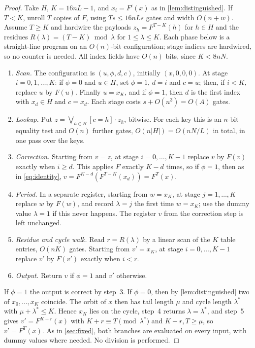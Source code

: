 \documentclass[11pt]{article}
\theoremstyle{definition}
\theoremstyle{remark}
\numberwithin{equation}{section}
\begin{document}
\begin{proof}
Take $H$, $K=16nL-1$, and $x_i=F^i(x)$ as in \cref{lem:distinguished}.  If
$T<K$, unroll $T$ copies of $F$, using $Ts\leq16nLs$ gates and width
$O(n+w)$.  Assume $T\geq K$ and hardwire the payloads $z_h=F^{T-K}(h)$ for
$h\in H$ and the residues $R(\lambda)=(T-K)\bmod\lambda$ for
$1\leq\lambda\leq K$.  Each phase below is a straight-line program on an
$O(n)$-bit configuration; stage indices are hardwired, so no counter is
needed.  All index fields have $O(n)$ bits, since $K<8nN$.
\begin{enumerate}
\item \emph{Scan.}  The configuration is $(u,\phi,d,c)$, initially
  $(x,0,0,0)$.  At stage $i=0,1,\ldots,K$: if $\phi=0$ and $u\in H$, set
  $\phi=1$, $d=i$ and $c=u$; then, if $i<K$, replace $u$ by $F(u)$.
  Finally $u=x_K$, and if $\phi=1$, then $d$ is the first index with
  $x_d\in H$ and $c=x_d$.  Each stage costs $s+O(n^3)=O(A)$ gates.
\item \emph{Lookup.}  Put $z=\bigvee_{h\in H}[c=h]\cdot z_h$, bitwise.
  For each key this is an $n$-bit equality test and $O(n)$ further
  gates, $O(n|H|)=O(nN/L)$ in total, in one pass over the keys.
\item \emph{Correction.}  Starting from $v=z$, at stage $i=0,\ldots,K-1$
  replace $v$ by $F(v)$ exactly when $i\geq d$.  This applies $F$ exactly
  $K-d$ times, so if $\phi=1$, then as in \cref{eq:identity},
  $v=F^{K-d}(F^{T-K}(x_d))=F^T(x)$.
\item \emph{Period.}  In a separate register, starting from $w=x_K$, at
  stage $j=1,\ldots,K$ replace $w$ by $F(w)$, and record $\lambda=j$ the
  first time $w=x_K$; use the dummy value $\lambda=1$ if this never
  happens.  The register $v$ from the correction step is left unchanged.
\item \emph{Residue and cycle walk.}  Read $r=R(\lambda)$ by a linear scan
  of the $K$ table entries, $O(nK)$ gates.  Starting from $v'=x_K$, at
  stage $i=0,\ldots,K-1$ replace $v'$ by $F(v')$ exactly when $i<r$.
\item \emph{Output.}  Return $v$ if $\phi=1$ and $v'$ otherwise.
\end{enumerate}
If $\phi=1$ the output is correct by step~3.  If $\phi=0$, then by
\cref{lem:distinguished} two of $x_0,\ldots,x_K$ coincide.  The orbit of
$x$ then has tail length $\mu$ and cycle length $\lambda^*$ with
$\mu+\lambda^*\leq K$.  Hence $x_K$ lies on the cycle, step~4 returns
$\lambda=\lambda^*$, and step~5 gives $v'=F^{K+r}(x)$ with
$K+r\equiv T\pmod{\lambda^*}$ and $K+r,T\geq\mu$, so $v'=F^T(x)$.  As in
\cref{sec:fixed}, both branches are evaluated on every input, with dummy
values where needed.  No division is performed.


\end{proof}
\end{document}
